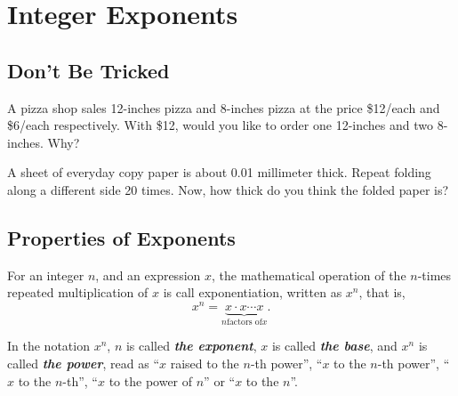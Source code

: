\documentclass[en,12pt]{elegantbook}
\let\BeginKnitrBlock\begin \let\EndKnitrBlock\end
\begin{document}
\hypertarget{integer-exponents}{%
\chapter{Integer Exponents}\label{integer-exponents}}

\hypertarget{dont-be-tricked}{%
\section{Don't Be Tricked}\label{dont-be-tricked}}

\BeginKnitrBlock{rmdthink}
A pizza shop sales 12-inches pizza and 8-inches pizza at the price \$12/each and \$6/each respectively. With \$12, would you like to order one 12-inches and two 8-inches. Why?
\EndKnitrBlock{rmdthink}

\BeginKnitrBlock{rmdthink}
A sheet of everyday copy paper is about 0.01 millimeter thick. Repeat folding along a different side 20 times. Now, how thick do you think the folded paper is?
\EndKnitrBlock{rmdthink}

\hypertarget{properties-of-exponents}{%
\section{Properties of Exponents}\label{properties-of-exponents}}

For an integer \(n\), and an expression \(x\), the mathematical operation of the \(n\)-times repeated multiplication of \(x\) is call exponentiation, written as \(x^n\), that is,
\[
x^n=\underbrace{x\cdot x \cdots x}_{n \text{factors of} x}.
\]

In the notation \(x^n\), \(n\) is called \textbf{\emph{the exponent}}, \(x\) is called \textbf{\emph{the base}}, and \(x^n\) is called \textbf{\emph{the power}}, read as ``\(x\) raised to the \(n\)-th power'', ``\(x\) to the \(n\)-th power'', ``\(x\) to the \(n\)-th'', ``\(x\) to the power of \(n\)'' or ``\(x\) to the \(n\)''.
\end{document}
